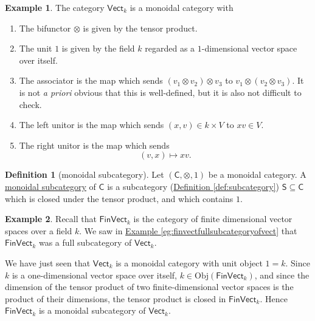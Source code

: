 \documentclass[a4paper]{report}
\newcommand{\defn}[1]{\ul{#1}}
\newcommand{\Obj}{\mathrm{Obj}}
\theoremstyle{definition}
\newtheorem{definition}{Definition}[section]
\newtheorem{example}{Example}[section]
\theoremstyle{plain}
\theoremstyle{remark}
\begin{document}
\begin{example}
  \label{eg:vectisamonoidalcategory}
  The category $\mathsf{Vect}_{k}$ is a monoidal category with
  \begin{enumerate}
    \item The bifunctor $\otimes$ is given by the tensor product.

    \item The unit $1$ is given by the field $k$ regarded as a $1$-dimensional vector space over itself.

    \item The associator is the map which sends $(v_{1} \otimes v_{2}) \otimes v_{3}$ to $v_{1} \otimes (v_{2} \otimes v_{3})$. It is not \emph{a priori} obvious that this is well-defined, but it is also not difficult to check.

    \item The left unitor is the map which sends $(x, v) \in k \times V$
      to $xv \in V$.

    \item The right unitor is the map which sends 
      \begin{equation*}
        (v, x) \mapsto xv.
      \end{equation*}
  \end{enumerate}
\end{example}

\begin{definition}[monoidal subcategory]
  \label{def:monoidalsubcategory}
  Let $(\mathsf{C}, \otimes, 1)$ be a monoidal category. A \defn{monoidal subcategory} of $\mathsf{C}$ is a subcategory (\hyperref[def:subcategory]{Definition \ref*{def:subcategory}}) $\mathsf{S} \subseteq \mathsf{C}$ which is closed under the tensor product, and which contains $1$.
\end{definition}

\begin{example}
  Recall that $\mathsf{FinVect}_{k}$ is the category of finite dimensional vector spaces over a field $k$. We saw in \hyperref[eg:finvectfullsubcategoryofvect]{Example \ref*{eg:finvectfullsubcategoryofvect}} that $\mathsf{FinVect}_{k}$ was a full subcategory of $\mathsf{Vect}_{k}$.

  We have just seen that $\mathsf{Vect}_{k}$ is a monoidal category with unit object $1 = k$. Since $k$ is a one-dimensional vector space over itself, $k \in \Obj(\mathsf{FinVect}_{k})$, and since the dimension of the tensor product of two finite-dimensional vector spaces is the product of their dimensions, the tensor product is closed in $\mathsf{FinVect}_{k}$. Hence $\mathsf{FinVect}_{k}$ is a monoidal subcategory of $\mathsf{Vect}_{k}$.
\end{example}
\end{document}
